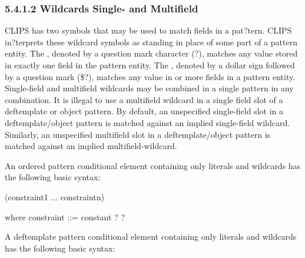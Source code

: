 \documentclass[letterpaper,10pt,english]{sphinxmanual}
\begin{document}
\subsubsection{5.4.1.2 Wildcards Single- and Multifield}
\label{\detokenize{defrule:wildcards-single-and-multifield}}
CLIPS has two  symbols that may be used to match fields in a
pat?tern. CLIPS in?terprets these wildcard symbols as standing in place
of some part of a pattern entity. The ,
denoted by a question mark character (?), matches any value stored in
exactly one field in the pattern entity. The ,
denoted by a dollar sign followed by a question mark (\$?), matches any
value in  or more fields in a pattern entity. Single-field and
multifield wildcards may be combined in a single pattern in any
combination. It is illegal to use a multifield wildcard in a single
field slot of a deftemplate or object pattern. By default, an
unspecified single-field slot in a deftemplate/object pattern is matched
against an implied single-field wildcard. Similarly, an unspecified
multifield slot in a deftemplate/object pattern is matched against an
implied multifield-wildcard.

An ordered pattern conditional element containing only literals and
wildcards has the following basic syntax:


\begin{sphinxVerbatim}[commandchars=\\\{\}]
(\PYGZlt{}constraint\PYGZhy{}1\PYGZgt{} ... \PYGZlt{}constraint\PYGZhy{}n\PYGZgt{})

where \PYGZlt{}constraint\PYGZgt{} ::= \PYGZlt{}constant\PYGZgt{} \textbar{} ? \textbar{} \PYGZdl{}?
\end{sphinxVerbatim}

A deftemplate pattern conditional element containing only literals and
wildcards has the following basic syntax:

\begin{sphinxVerbatim}[commandchars=\\\{\}]
  
    
\end{sphinxVerbatim}
\end{document}
